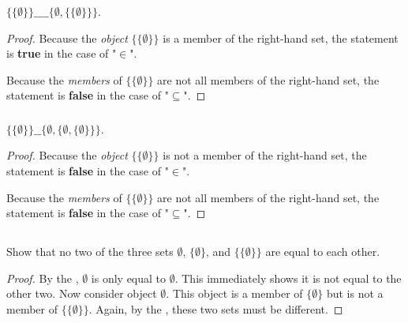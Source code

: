 \documentclass{report}
\begin{document}
\subsubsection{}%
\label{ssub:baby-set-theory-1d}

$\{\{\emptyset\}\} \_\_\_\_ \{\emptyset, \{\{\emptyset\}\}\}$.

\begin{proof}

  Because the \textit{object} $\{\{\emptyset\}\}$ is a member of the right-hand
    set, the statement is \textbf{true} in the case of "$\in$".

  Because the \textit{members} of $\{\{\emptyset\}\}$ are not all members of the
    right-hand set, the statement is \textbf{false} in the case of
    "$\subseteq$".

\end{proof}

\subsubsection{}%
\label{ssub:baby-set-theory-1e}

$\{\{\emptyset\}\} \_\_ \{\emptyset, \{\emptyset, \{\emptyset\}\}\}$.

\begin{proof}

  Because the \textit{object} $\{\{\emptyset\}\}$ is not a member of the
    right-hand set, the statement is \textbf{false} in the case of "$\in$".

  Because the \textit{members} of $\{\{\emptyset\}\}$ are not all members of the
    right-hand set, the statement is \textbf{false} in the case of
    "$\subseteq$".

\end{proof}

\subsection{}%
\label{sub:baby-set-theory-2}

Show that no two of the three sets $\emptyset$, $\{\emptyset\}$, and
  $\{\{\emptyset\}\}$ are equal to each other.

\begin{proof}

  By the , $\emptyset$ is only equal to
    $\emptyset$.
  This immediately shows it is not equal to the other two.
  Now consider object $\emptyset$.
  This object is a member of $\{\emptyset\}$ but is not a member of
    $\{\{\emptyset\}\}$.
  Again, by the , these two sets must be
    different.

\end{proof}
\end{document}
